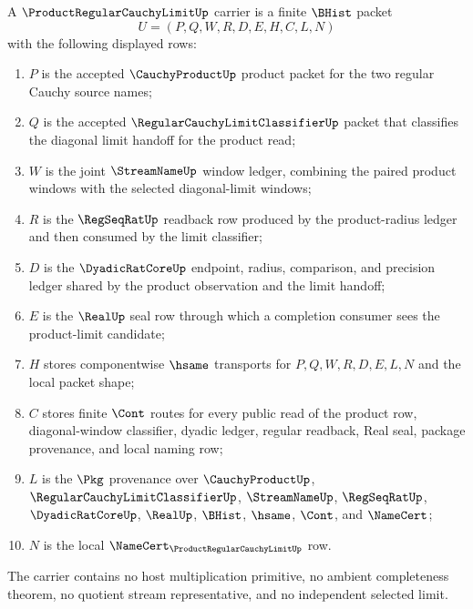 \begin{definition}
\label{def:product-regular-cauchy-limit-carrier}
A $\ProductRegularCauchyLimitUp$ carrier is a finite $\BHist$ packet
$$
U=(P,Q,W,R,D,E,H,C,L,N)
$$
with the following displayed rows:
\begin{enumerate}
\item $P$ is the accepted $\CauchyProductUp$ product packet for the two regular Cauchy source names;
\item $Q$ is the accepted $\RegularCauchyLimitClassifierUp$ packet that classifies the diagonal limit handoff for the product read;
\item $W$ is the joint $\StreamNameUp$ window ledger, combining the paired product windows with the selected diagonal-limit windows;
\item $R$ is the $\RegSeqRatUp$ readback row produced by the product-radius ledger and then consumed by the limit classifier;
\item $D$ is the $\DyadicRatCoreUp$ endpoint, radius, comparison, and precision ledger shared by the product observation and the limit handoff;
\item $E$ is the $\RealUp$ seal row through which a completion consumer sees the product-limit candidate;
\item $H$ stores componentwise $\hsame$ transports for $P,Q,W,R,D,E,L,N$ and the local packet shape;
\item $C$ stores finite $\Cont$ routes for every public read of the product row, diagonal-window classifier, dyadic ledger, regular readback, Real seal, package provenance, and local naming row;
\item $L$ is the $\Pkg$ provenance over $\CauchyProductUp$, $\RegularCauchyLimitClassifierUp$, $\StreamNameUp$, $\RegSeqRatUp$, $\DyadicRatCoreUp$, $\RealUp$, $\BHist$, $\hsame$, $\Cont$, and $\NameCert$;
\item $N$ is the local $\NameCert_{\ProductRegularCauchyLimitUp}$ row.
\end{enumerate}
The carrier contains no host multiplication primitive, no ambient completeness theorem, no quotient stream representative, and no independent selected limit.
\end{definition}

